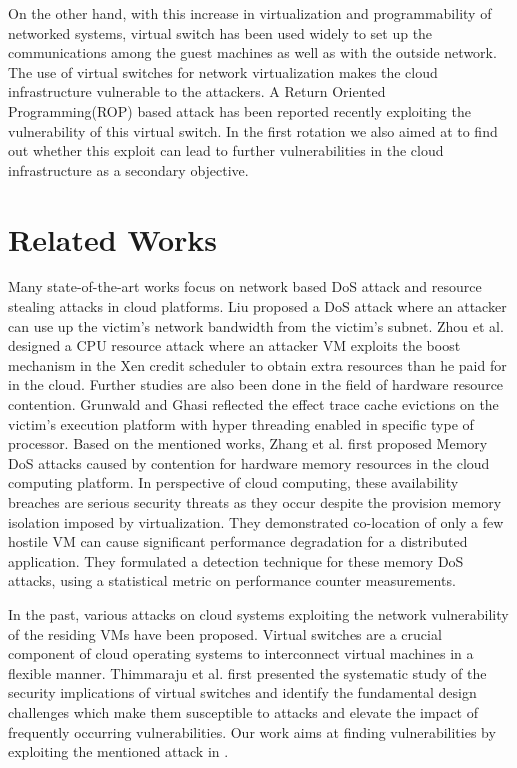 \documentclass[a4paper,10pt]{article}
\begin{document}
On the other hand, with this increase in virtualization and programmability of networked systems, virtual switch has been used widely to set up the communications among the guest machines as well as with the outside network. The use of virtual switches for network virtualization makes the cloud infrastructure vulnerable to the attackers. A Return Oriented Programming(ROP) based attack has been reported recently exploiting the vulnerability of this virtual switch. In the first rotation we also aimed at to find out whether this exploit can lead to further vulnerabilities in the cloud infrastructure as a secondary objective.  

\medskip

\section{Related Works}
Many state-of-the-art works focus on network based DoS attack and resource stealing attacks in cloud platforms. Liu\cite{dos} proposed a DoS attack where an attacker can use up the victim's network bandwidth from the victim's subnet. Zhou et al.\cite{sc} designed a CPU resource attack where an attacker VM exploits the boost mechanism in the Xen credit scheduler to obtain extra resources than he paid for in the cloud. Further studies are also been done in the field of hardware resource contention. Grunwald and Ghasi\cite{grun} reflected the effect trace  cache evictions on the victim's execution platform with hyper threading enabled in specific type of processor. Based on the mentioned works, Zhang et al.\cite{cacheCleansing} first proposed Memory DoS attacks caused by contention for hardware memory resources in the cloud computing platform. In perspective of cloud computing, these availability breaches are serious security threats as they occur despite the provision memory isolation imposed by virtualization. They demonstrated co-location of only a few hostile VM can cause significant performance degradation for a distributed application. They formulated a detection technique for these memory DoS attacks, using a statistical metric on performance counter measurements. 

In the past, various attacks on cloud systems exploiting the network vulnerability of the residing VMs have been proposed. Virtual switches are a crucial component of cloud operating systems to interconnect virtual machines in a flexible manner. Thimmaraju et al.\cite{thim} first presented the systematic study of the security implications of virtual switches and identify the fundamental design challenges which make them susceptible to attacks and elevate the impact of frequently occurring vulnerabilities. Our work aims at finding vulnerabilities by exploiting the mentioned attack in \cite{thim}.  
\end{document}
